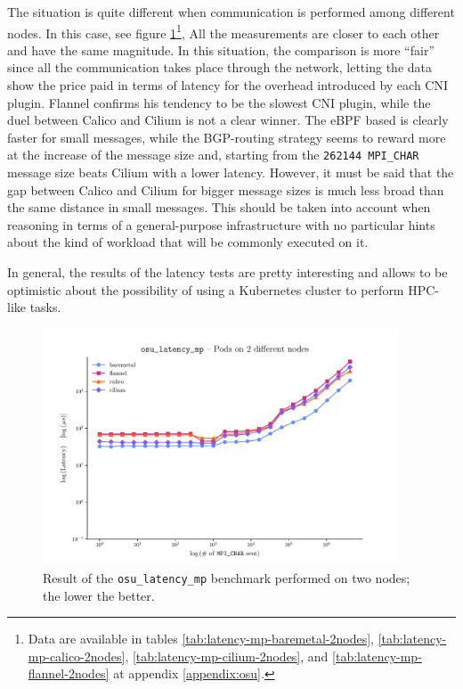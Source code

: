 The situation is quite different when communication is performed among different nodes.
In this case, see figure \ref{fig:latency-mp-2-nodes}\footnote{Data are available in tables
  \ref{tab:latency-mp-baremetal-2nodes}, \ref{tab:latency-mp-calico-2nodes},
  \ref{tab:latency-mp-cilium-2nodes}, and \ref{tab:latency-mp-flannel-2nodes} at
  appendix \ref{appendix:osu}.},
All the measurements are closer to each other and have the same magnitude.
In this situation, the comparison is more ``fair'' since all the communication
takes place through the network, letting the data show the price paid in terms
of latency for the overhead introduced by each CNI plugin.
Flannel confirms his tendency to be the slowest CNI plugin, while the duel
between Calico and Cilium is not a clear winner. The eBPF based is clearly
faster for small messages, while the BGP-routing strategy seems to reward more
at the increase of the message size and, starting from the \texttt{262144
  MPI\_CHAR} message size beats Cilium with a lower latency.
However, it must be said that the gap between Calico and Cilium for bigger
message sizes is much less broad than the same distance in small messages.
This should be taken into account when reasoning in terms of a general-purpose
infrastructure with no particular hints about the kind of workload that will be
commonly executed on it.

In general, the results of the latency tests are pretty interesting and
allows to be optimistic about the possibility of using a Kubernetes cluster to
perform HPC-like tasks.

\begin{figure}
  \centering
  \includegraphics[width=0.94\textwidth]{img/chpt3/latency_mp-2-nodes}
  \caption{Result of the \texttt{osu\_latency\_mp} benchmark performed on two
    nodes; the lower the better.}
  \label{fig:latency-mp-2-nodes}
\end{figure}

